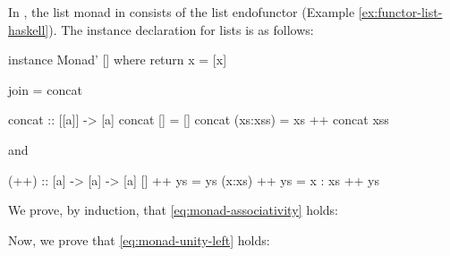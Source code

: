 \begin{example}
  \label{ex:monad-list-haskell}

  In \hask, the list monad in \hask consists of the list endofunctor
  (Example \ref{ex:functor-list-haskell}). The instance declaration
  for lists is as follows:
  \begin{codehaskell}
instance Monad' [] where
  return x = [x]

  join = concat
  \end{codehaskell}

  \begin{codehaskell}
concat :: [[a]] -> [a]
concat []       = []
concat (xs:xss) = xs ++ concat xss
  \end{codehaskell}
  and
  \begin{codehaskell}
(++) :: [a] -> [a] -> [a]
[]     ++ ys = ys
(x:xs) ++ ys = x : xs ++ ys
  \end{codehaskell}

  We prove, by induction, that \eqref{eq:monad-associativity} holds:

  \vspace{1em}
  \caseh{[]}
  \begin{steps}
  \end{steps}
  \begin{steps}
      \eqbydefh{}
      \eqbyih
      \eqbydefh{}
  \end{steps}
  Now, we prove that \eqref{eq:monad-unity-left} holds:
  \begin{steps}



\end{steps}
\end{example}
